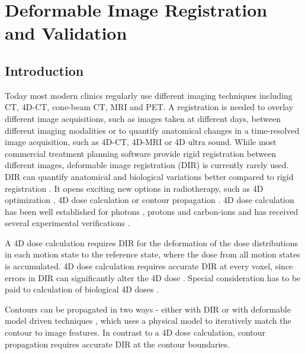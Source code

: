 \chapter{Deformable Image Registration and Validation}
\label{chapter:vmm}
\minitoc

\section{Introduction}


Today most modern clinics regularly use different imaging techniques including CT, 4D-CT, cone-beam CT, MRI and PET. A registration is needed to overlay different image acquisitions, such as images taken at different days,
between different imaging modalities or to quantify anatomical changes in a time-resolved image acquisition, such as 4D-CT, 4D-MRI or 4D ultra sound. While most commercial treatment planning software provide rigid registration between different images, deformable image registration (DIR) is currently rarely used. 
DIR can quantify anatomical and biological variations better compared to rigid registration \cite{Sarrut2006}. It opens exciting new options in radiotherapy, such as 4D optimization \cite{Trofimov2005}, 
4D dose calculation \cite{Flampouri2006} or contour propagation \cite{Lu2006b}. 4D dose calculation has been well established for photons \cite{Ong2016}, protons \cite{Paganetti2005} and carbon-ions \cite{Gemmel2011} and has received
several experimental verifications \cite{Vinogradskiy2009, Perrin2016, Bert2012a}. 

A 4D dose calculation requires DIR for the deformation of the dose distributions in each motion state
to the reference state, where the dose from all motion states is accumulated. 4D dose calculation requires accurate DIR at every voxel, since errors in DIR can significantly alter the 4D dose \cite{Heath2006}. Special consideration has to be paid to calculation of biological 4D doses \cite{Gemmel2011}. 

Contours can be propagated in two ways - either with DIR \cite{Lu2006a, Rietzel2005a} or
with deformable model driven techniques \cite{McInerney1996}, which uses a physical model to iteratively match the contour to image features. In contrast to a 4D dose calculation, contour propagation requires accurate DIR at the contour boundaries.


